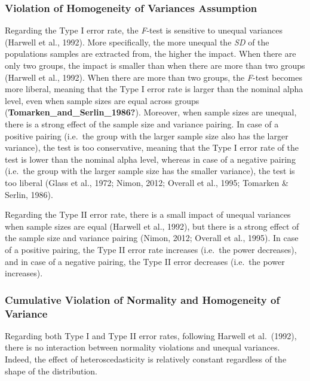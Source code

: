 \documentclass[
  english,
  man]{apa6}
\begin{document}
\hypertarget{violation-of-homogeneity-of-variances-assumption}{%
\subsubsection{Violation of Homogeneity of Variances Assumption}\label{violation-of-homogeneity-of-variances-assumption}}

Regarding the Type I error rate, the \emph{F}-test is sensitive to unequal variances (Harwell et al., 1992). More specifically, the more unequal the \emph{SD} of the populations samples are extracted from, the higher the impact. When there are only two groups, the impact is smaller than when there are more than two groups (Harwell et al., 1992). When there are more than two groups, the \emph{F}-test becomes more liberal, meaning that the Type I error rate is larger than the nominal alpha level, even when sample sizes are equal across groups (\textbf{Tomarken\_and\_Serlin\_1986?}). Moreover, when sample sizes are unequal, there is a strong effect of the sample size and variance pairing. In case of a positive pairing (i.e.~the group with the larger sample size also has the larger variance), the test is too conservative, meaning that the Type I error rate of the test is lower than the nominal alpha level, whereas in case of a negative pairing (i.e.~the group with the larger sample size has the smaller variance), the test is too liberal (Glass et al., 1972; Nimon, 2012; Overall et al., 1995; Tomarken \& Serlin, 1986).

Regarding the Type II error rate, there is a small impact of unequal variances when sample sizes are equal (Harwell et al., 1992), but there is a strong effect of the sample size and variance pairing (Nimon, 2012; Overall et al., 1995). In case of a positive pairing, the Type II error rate increases (i.e.~the power decreases), and in case of a negative pairing, the Type II error decreases (i.e.~the power increases).

\hypertarget{cumulative-violation-of-normality-and-homogeneity-of-variance}{%
\subsubsection{Cumulative Violation of Normality and Homogeneity of Variance}\label{cumulative-violation-of-normality-and-homogeneity-of-variance}}

Regarding both Type I and Type II error rates, following Harwell et al.~(1992), there is no interaction between normality violations and unequal variances. Indeed, the effect of heteroscedasticity is relatively constant regardless of the shape of the distribution.
\end{document}
